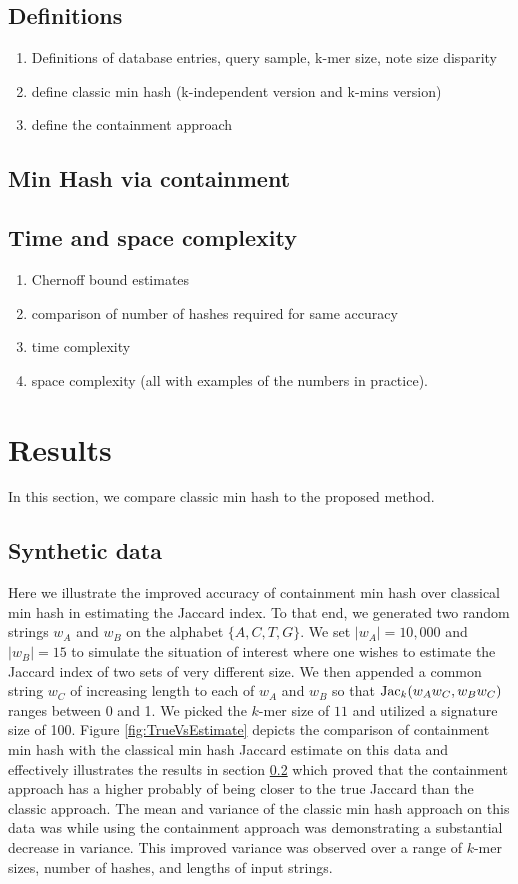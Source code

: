 \documentclass[11pt]{amsart}
\theoremstyle{remark}
\numberwithin{equation}{section}
\newcommand{\themethod}{containment min hash }
\DeclareMathOperator{\Jac}{{\rm Jac}}
\begin{document}
\subsection{Definitions}
\begin{enumerate}
\item Definitions of database entries, query sample, k-mer size, note size disparity
\item define classic min hash (k-independent version and k-mins version)
\item define the containment approach
\end{enumerate}
\subsection{Min Hash via containment}
\label{section:ChernoffBounds}
\subsection{Time and space complexity}
\begin{enumerate}
\item Chernoff bound estimates
\item comparison of number of hashes required for same accuracy
\item time complexity
\item space complexity (all with examples of the numbers in practice).
\end{enumerate}


\section{Results}
In this section, we compare classic min hash to the proposed method.
\subsection{Synthetic data}
\label{section:SyntheticData}
Here we illustrate the improved accuracy of \themethod over classical min hash in estimating the Jaccard index. To that end, we generated two random strings $w_A$ and $w_B$ on the alphabet $\{A,C,T,G\}$. We set $|w_A|= 10,000$ and $|w_B| = 15$ to simulate the situation of interest where one wishes to estimate the Jaccard index of two sets of very different size. We then appended a common string $w_C$ of increasing length to each of $w_A$ and $w_B$ so that $\Jac_k(w_Aw_C, w_Bw_C)$ ranges between 0 and 1. We picked the $k$-mer size of $11$ and utilized a signature size of 100. Figure \ref{fig:TrueVsEstimate} depicts the comparison of \themethod with the classical min hash Jaccard estimate on this data and effectively illustrates the results in section \ref{section:ChernoffBounds} which proved that the containment approach has a higher probably of being closer to the true Jaccard than the classic approach. The mean and variance of the classic min hash approach on this data was while using the containment approach was demonstrating a substantial decrease in variance. This improved variance was observed over a range of $k$-mer sizes, number of hashes, and lengths of input strings.
\end{document}
